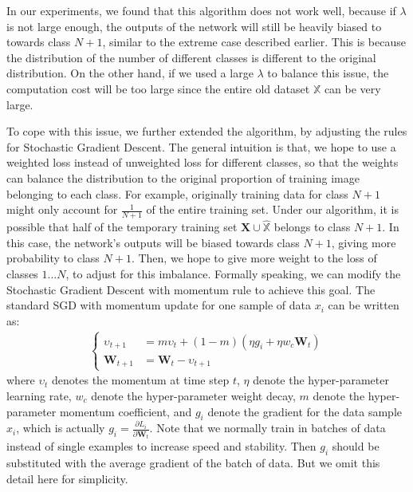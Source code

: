 In our experiments, we found that this algorithm does not work well, because if $\lambda$ is not large enough, the outputs of the network will still be heavily biased to towards class $N+1$, similar to the extreme case described earlier. This is because the distribution of the number of different classes is different to the original distribution. On the other hand, if we used a large $\lambda$ to balance this issue, the computation cost will be too large since the entire old dataset $\mathbb{X}$ can be very large.

To cope with this issue, we further extended the algorithm, by adjusting the rules for Stochastic Gradient Descent. The general intuition is that, we hope to use a weighted loss instead of unweighted loss for different classes, so that the weights can balance the distribution to the original proportion of training image belonging to each class. For example, originally training data for class $N+1$ might only account for $\frac{1}{N+1}$ of the entire training set. Under our algorithm, it is possible that half of the temporary training set $\mathbf{X} \cup \hat{\mathbb{X}}$ belongs to class $N+1$. In this case, the network's outputs will be biased towards class $N+1$, giving more probability to class $N+1$. Then, we hope to give more weight to the loss of classes $1...N$, to adjust for this imbalance. Formally speaking, we can modify the Stochastic Gradient Descent with momentum rule to achieve this goal. The standard SGD with momentum update for one sample of data $x_i$ can be written as:
\begin{align}
\left\{
\begin{aligned}
	\upsilon_{t+1} &= m\upsilon_t + (1-m)\left( \eta g_i + \eta w_c \mathbf{W}_t \right)\\
	\mathbf{W}_{t+1} &= \mathbf{W}_{t} - \upsilon_{t+1}
\end{aligned}
\right.
\label{sgdrule}
\end{align}
where $\upsilon_t$ denotes the momentum at time step $t$, $\eta$ denote the hyper-parameter learning rate, $w_c$ denote the hyper-parameter weight decay, $m$ denote the hyper-parameter momentum coefficient, and $g_i$ denote the gradient for the data sample $x_i$, which is actually $g_i = \frac{\partial L_i}{\partial \mathbf{W}_t}$. Note that we normally train in batches of data instead of single examples to increase speed and stability. Then $g_i$ should be substituted with the average gradient of the batch of data. But we omit this detail here for simplicity.

